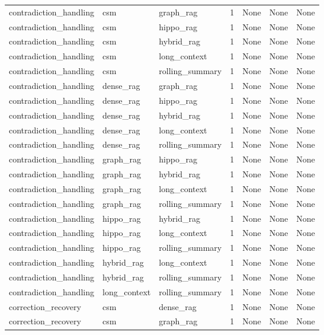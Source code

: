 \begin{tabular}{lllllll}
contradiction\_handling & csm & graph\_rag & 1 & None & None & None \\
contradiction\_handling & csm & hippo\_rag & 1 & None & None & None \\
contradiction\_handling & csm & hybrid\_rag & 1 & None & None & None \\
contradiction\_handling & csm & long\_context & 1 & None & None & None \\
contradiction\_handling & csm & rolling\_summary & 1 & None & None & None \\
contradiction\_handling & dense\_rag & graph\_rag & 1 & None & None & None \\
contradiction\_handling & dense\_rag & hippo\_rag & 1 & None & None & None \\
contradiction\_handling & dense\_rag & hybrid\_rag & 1 & None & None & None \\
contradiction\_handling & dense\_rag & long\_context & 1 & None & None & None \\
contradiction\_handling & dense\_rag & rolling\_summary & 1 & None & None & None \\
contradiction\_handling & graph\_rag & hippo\_rag & 1 & None & None & None \\
contradiction\_handling & graph\_rag & hybrid\_rag & 1 & None & None & None \\
contradiction\_handling & graph\_rag & long\_context & 1 & None & None & None \\
contradiction\_handling & graph\_rag & rolling\_summary & 1 & None & None & None \\
contradiction\_handling & hippo\_rag & hybrid\_rag & 1 & None & None & None \\
contradiction\_handling & hippo\_rag & long\_context & 1 & None & None & None \\
contradiction\_handling & hippo\_rag & rolling\_summary & 1 & None & None & None \\
contradiction\_handling & hybrid\_rag & long\_context & 1 & None & None & None \\
contradiction\_handling & hybrid\_rag & rolling\_summary & 1 & None & None & None \\
contradiction\_handling & long\_context & rolling\_summary & 1 & None & None & None \\
correction\_recovery & csm & dense\_rag & 1 & None & None & None \\
correction\_recovery & csm & graph\_rag & 1 & None & None & None \\

\end{tabular}
